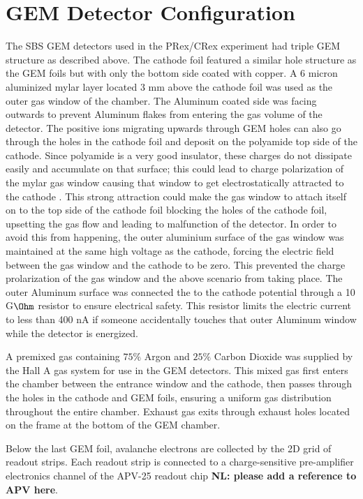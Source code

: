 \section{GEM Detector Configuration}

The SBS GEM detectors used in the PRex/CRex experiment  had  triple GEM structure as described above. The cathode foil  featured a similar hole structure as the GEM foils  but  with only the bottom side coated with copper. A 6 micron   aluminized mylar layer located 3 mm above the cathode foil was used as the outer gas window of the chamber. The Aluminum coated side was facing outwards to prevent Aluminum flakes from entering the gas volume of the detector. The positive ions migrating upwards through GEM holes can also go through the holes in the cathode foil and deposit on the polyamide top side of the cathode. Since polyamide is a very good insulator, these charges do not dissipate easily and accumulate on that surface; this could lead to  charge polarization of the mylar gas  window causing  that window to get electrostatically attracted to the cathode . This strong attraction could make the gas window to attach itself on to the top side of the cathode foil blocking the holes of the cathode foil, upsetting the gas flow  and leading to malfunction of the detector. In order to avoid  this from happening, the outer aluminium surface of the gas window was maintained at the same high voltage as the cathode, forcing the electric field between the gas window and the cathode to be zero. This prevented the charge prolarization of the gas window and the above scenario from taking place. The outer Aluminum surface was connected the to the cathode potential through a  10 G$\Ohm$ resistor to ensure electrical safety. This resistor limits the electric current to less than 400 nA if someone accidentally touches that outer Aluminum window while the detector is energized. 

A premixed gas containing $75\%$ Argon and $25\%$ Carbon Dioxide was  supplied by the Hall A gas system for use in the GEM detectors. This mixed gas first enters the  chamber between the entrance window and the cathode, then passes through the holes in the cathode and GEM foils, ensuring a uniform gas distribution  throughout the entire chamber. Exhaust gas exits through exhaust holes located on the frame at the bottom of the GEM chamber.

Below the last  GEM foil, avalanche electrons are collected by the 2D grid of  readout strips. Each readout strip is connected to a charge-sensitive pre-amplifier electronics channel of the APV-25 readout chip {\bf NL: please add a reference to APV here}. 

